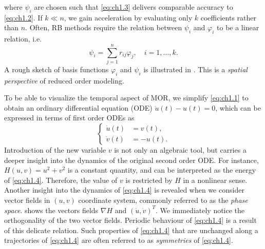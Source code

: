 where $\psi_i$ are chosen such that \eqref{eq:ch1.3} delivers comparable accuracy to \eqref{eq:ch1.2}. If $k \ll n$, we gain acceleration by evaluating only $k$ coefficients rather than $n$. Often, RB methods require the relation between $\psi_i$ and $\varphi_i$ to be a linear relation, i.e.
\begin{equation} \label{eq:ch1.3.1}
	\psi_i = \sum_{j=1}^n r_{ij} \varphi_j, \quad i=1,\dots,k.
\end{equation}
A rough sketch of basis functions $\varphi_i$ and $\psi_i$ is illustrated in . This is a \emph{spatial perspective} of reduced order modeling.

To be able to visualize the temporal aspect of MOR, we simplify \eqref{eq:ch1.1} to obtain an ordinary differential equation (ODE) $\ddot u(t) - u(t) = 0$, which can be expressed in terms of first order ODEs as
\begin{equation} \label{eq:ch1.4}
	\left\{
	\begin{aligned}
		\dot u(t) &= v(t), \\
		\dot v(t) &= -u(t).
	\end{aligned}
	\right.
\end{equation}
Introduction of the new variable $v$ is not only an algebraic tool, but carries a deeper insight into the dynamics of the original second order ODE. For instance, $H(u,v) = u^2 + v^2$ is a constant quantity, and can be interpreted as the energy of \eqref{eq:ch1.4}. Therefore, the value of $v$ is restricted by $H$ in a nonlinear sense. Another insight into the dynamics of \eqref{eq:ch1.4} is revealed when we consider vector fields in $(u,v)$ coordinate system, commonly referred to as the \emph{phase space}.  shows the vectors fields $\nabla H$ and $(\dot u, \dot v)^T$. We immediately notice the orthogonality of the two vector fields. Periodic behaviour of \eqref{eq:ch1.4} is a result of this delicate relation. Such properties of \eqref{eq:ch1.4} that are unchanged along a trajectories of \eqref{eq:ch1.4} are often referred to as \emph{symmetries} of \eqref{eq:ch1.4}.
